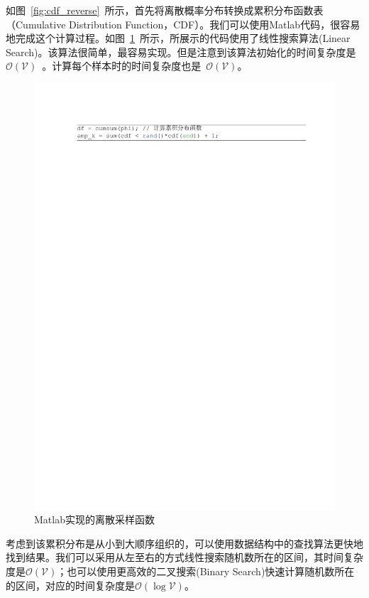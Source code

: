如图~\ref{fig:cdf_reverse}~所示，首先将离散概率分布转换成累积分布函数表（Cumulative Distribution Function，CDF）。我们可以使用Matlab代码，很容易地完成这个计算过程。如图~\ref{fig:sample}~所示，所展示的代码使用了线性搜索算法(Linear Search)。该算法很简单，最容易实现。但是注意到该算法初始化的时间复杂度是~$\mathcal{O(\mathcal{V})}$~。计算每个样本时的时间复杂度也是~$\mathcal{O(V)}$。
\begin{figure}[!t]
  \centering
\includegraphics[width=1\linewidth]{./figures/cdf.pdf}
\caption{Matlab实现的离散采样函数}\label{fig:sample}
\end{figure}


考虑到该累积分布是从小到大顺序组织的，可以使用数据结构中的查找算法更快地找到结果。我们可以采用从左至右的方式线性搜索随机数所在的区间，其时间复杂度是$\mathcal{O}(\mathcal{V})$；也可以使用更高效的二叉搜索(Binary Search)快速计算随机数所在的区间，对应的时间复杂度是$\mathcal{O}(\log \mathcal{V})$。



